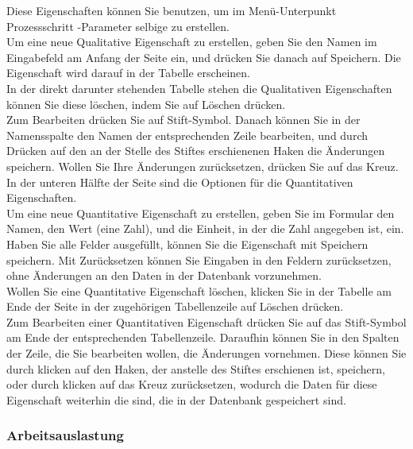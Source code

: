 \documentclass[enabledeprecatedfontcommands,fontsize=12pt,paper=a4,twoside]{scrartcl}
\begin{document}
Diese Eigenschaften können Sie benutzen, um im Menü-Unterpunkt Prozessschritt -Parameter selbige zu erstellen. \\

Um eine neue Qualitative Eigenschaft zu erstellen, geben Sie den Namen im Eingabefeld am Anfang der Seite ein, und drücken Sie danach auf Speichern. Die Eigenschaft wird darauf in der Tabelle erscheinen. \\



In der direkt darunter stehenden Tabelle stehen die Qualitativen Eigenschaften können Sie diese löschen, indem Sie auf Löschen drücken. \\

Zum Bearbeiten drücken Sie auf Stift-Symbol. Danach können Sie in der Namensspalte den Namen der entsprechenden Zeile bearbeiten, und durch Drücken auf den an der Stelle des Stiftes erschienenen Haken die Änderungen speichern. Wollen Sie Ihre Änderungen zurücksetzen, drücken Sie auf das Kreuz. \\

In der unteren Hälfte der Seite sind die Optionen für die Quantitativen Eigenschaften. \\

Um eine neue Quantitative Eigenschaft zu erstellen, geben Sie im Formular den Namen, den Wert (eine Zahl), und die Einheit, in der die Zahl angegeben ist, ein. Haben Sie alle Felder ausgefüllt, können Sie die Eigenschaft mit Speichern speichern. Mit Zurücksetzen können Sie Eingaben in den Feldern zurücksetzen, ohne Änderungen an den Daten in der Datenbank vorzunehmen. \\

Wollen Sie eine Quantitative Eigenschaft löschen, klicken Sie in der Tabelle am Ende der Seite in der zugehörigen Tabellenzeile auf Löschen drücken. \\

Zum Bearbeiten einer Quantitativen Eigenschaft drücken Sie auf das Stift-Symbol am Ende der entsprechenden Tabellenzeile. Daraufhin können Sie in den Spalten der Zeile, die Sie bearbeiten wollen, die Änderungen vornehmen. Diese können Sie durch klicken auf den Haken, der anstelle des Stiftes erschienen ist, speichern, oder durch klicken auf das Kreuz zurücksetzen, wodurch die Daten für diese Eigenschaft weiterhin die sind, die in der Datenbank gespeichert sind. \\
\subsubsection{Arbeitsauslastung}
\end{document}

